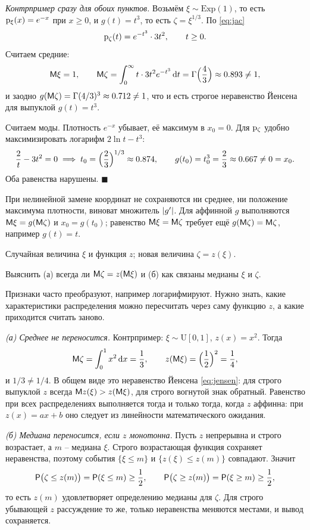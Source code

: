 \documentclass[12pt,a4paper]{article}
\begin{document}
\emph{Контрпример сразу для обоих пунктов.} Возьмём $\xi \sim \mathrm{Exp}(1)$,
то есть $\mathrm{p}_\xi(x) = e^{-x}$ при $x \ge 0$, и $g(t) = t^3$, то есть
$\zeta = \xi^{1/3}$. По \eqref{eq:jac}
\[
  \mathrm{p}_\zeta(t) = e^{-t^3}\cdot 3t^2, \qquad t \ge 0 .
\]
Считаем средние:
\[
  \mathsf{M}\xi = 1, \qquad
  \mathsf{M}\zeta = \int_0^{\infty} t\cdot 3t^2 e^{-t^3}\,\mathrm{d} t
            = \Gamma\Bigl(\frac43\Bigr) \approx 0.893 \ne 1,
\]
и заодно $g(\mathsf{M}\zeta) = \Gamma(4/3)^3 \approx 0.712 \ne 1$, что и есть строгое
неравенство Йенсена для выпуклой $g(t) = t^3$.

Считаем моды. Плотность $e^{-x}$ убывает, её максимум в $x_0 = 0$. Для
$\mathrm{p}_\zeta$ удобно максимизировать логарифм $2\ln t - t^3$:
\[
  \frac{2}{t} - 3t^2 = 0 \;\Longrightarrow\;
  t_0 = \Bigl(\frac23\Bigr)^{1/3} \approx 0.874,
  \qquad
  g(t_0) = t_0^3 = \frac23 \approx 0.667 \ne 0 = x_0 .
\]
Оба равенства нарушены. $\blacksquare$

\smallskip
При нелинейной замене координат не сохраняются ни среднее, ни положение
максимума плотности, виноват множитель $\left\lvert g' \right\rvert$. Для аффинной $g$ выполняются
$\mathsf{M}\xi = g(\mathsf{M}\zeta)$ и $x_0 = g(t_0)$; равенство $\mathsf{M}\xi = \mathsf{M}\zeta$
требует ещё $g(\mathsf{M}\zeta) = \mathsf{M}\zeta$, например $g(t) = t$.

\dano Случайная величина $\xi$ и функция $z$; новая величина $\zeta = z(\xi)$.

\treb Выяснить (а) всегда ли $\mathsf{M}\zeta = z(\mathsf{M}\xi)$ и (б) как связаны медианы
$\xi$ и $\zeta$.

\zachem Признаки часто преобразуют, например логарифмируют. Нужно знать, какие
характеристики распределения можно пересчитать через саму функцию $z$, а какие
приходится считать заново.

\resh
\emph{(а) Среднее не переносится.} Контрпример: $\xi \sim \mathrm{U}[0,1]$,
$z(x) = x^2$. Тогда
\[
  \mathsf{M}\zeta = \int_0^1 x^2\,\mathrm{d} x = \frac13,
  \qquad
  z(\mathsf{M}\xi) = \Bigl(\frac12\Bigr)^2 = \frac14,
\]
и $1/3 \ne 1/4$. В общем виде это неравенство Йенсена \eqref{eq:jensen}: для
строго выпуклой $z$ всегда $\mathsf{M} z(\xi) > z(\mathsf{M}\xi)$, для строго вогнутой знак
обратный. Равенство при всех распределениях выполняется тогда и только тогда,
когда $z$ аффинна: при $z(x) = ax + b$ оно следует из линейности
математического ожидания.

\emph{(б) Медиана переносится, если $z$ монотонна.} Пусть $z$ непрерывна и
строго возрастает, а $m$ -- медиана $\xi$. Строго возрастающая функция сохраняет
неравенства, поэтому события $\{\xi \le m\}$ и $\{z(\xi) \le z(m)\}$ совпадают.
Значит
\[
  \mathsf{P}\bigl(\zeta \le z(m)\bigr) = \mathsf{P}(\xi \le m) \ge \frac12,
  \qquad
  \mathsf{P}\bigl(\zeta \ge z(m)\bigr) = \mathsf{P}(\xi \ge m) \ge \frac12,
\]
то есть $z(m)$ удовлетворяет определению медианы для $\zeta$. Для строго
убывающей $z$ рассуждение то же, только неравенства меняются местами, и вывод
сохраняется.
\end{document}
